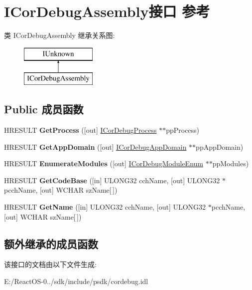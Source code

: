 \hypertarget{interface_i_cor_debug_assembly}{}\section{I\+Cor\+Debug\+Assembly接口 参考}
\label{interface_i_cor_debug_assembly}
类 I\+Cor\+Debug\+Assembly 继承关系图\+:\begin{figure}[H]
\begin{center}
\leavevmode
\includegraphics[height=2.000000cm]{interface_i_cor_debug_assembly}
\end{center}
\end{figure}
\subsection*{Public 成员函数}
\begin{DoxyCompactItemize}
\item 
\mbox{\label{interface_i_cor_debug_assembly_a0c5b46e18ee4dce9dd25f43c7701107b}} 
H\+R\+E\+S\+U\+LT {\bfseries Get\+Process} (\mbox{[}out\mbox{]} \hyperlink{interface_i_cor_debug_process}{I\+Cor\+Debug\+Process} $\ast$$\ast$pp\+Process)
\item 
\mbox{\label{interface_i_cor_debug_assembly_ac3f3db890ae4c74af21041059752ff69}} 
H\+R\+E\+S\+U\+LT {\bfseries Get\+App\+Domain} (\mbox{[}out\mbox{]} \hyperlink{interface_i_cor_debug_app_domain}{I\+Cor\+Debug\+App\+Domain} $\ast$$\ast$pp\+App\+Domain)
\item 
\mbox{\label{interface_i_cor_debug_assembly_ad49c25ef0ff932af4b3ade0ea8cedf37}} 
H\+R\+E\+S\+U\+LT {\bfseries Enumerate\+Modules} (\mbox{[}out\mbox{]} \hyperlink{interface_i_cor_debug_module_enum}{I\+Cor\+Debug\+Module\+Enum} $\ast$$\ast$pp\+Modules)
\item 
\mbox{\label{interface_i_cor_debug_assembly_aa9689b20750a5b6a5f4aa25850aaaaa1}} 
H\+R\+E\+S\+U\+LT {\bfseries Get\+Code\+Base} (\mbox{[}in\mbox{]} U\+L\+O\+N\+G32 cch\+Name, \mbox{[}out\mbox{]} U\+L\+O\+N\+G32 $\ast$pcch\+Name, \mbox{[}out\mbox{]} W\+C\+H\+AR sz\+Name\mbox{[}$\,$\mbox{]})
\item 
\mbox{\label{interface_i_cor_debug_assembly_a1c70cc9156bf7989b6e0a288912475c4}} 
H\+R\+E\+S\+U\+LT {\bfseries Get\+Name} (\mbox{[}in\mbox{]} U\+L\+O\+N\+G32 cch\+Name, \mbox{[}out\mbox{]} U\+L\+O\+N\+G32 $\ast$pcch\+Name, \mbox{[}out\mbox{]} W\+C\+H\+AR sz\+Name\mbox{[}$\,$\mbox{]})
\end{DoxyCompactItemize}
\subsection*{额外继承的成员函数}


该接口的文档由以下文件生成\+:\begin{DoxyCompactItemize}
\item 
E\+:/\+React\+O\+S-\/0../sdk/include/psdk/cordebug.\+idl\end{DoxyCompactItemize}
